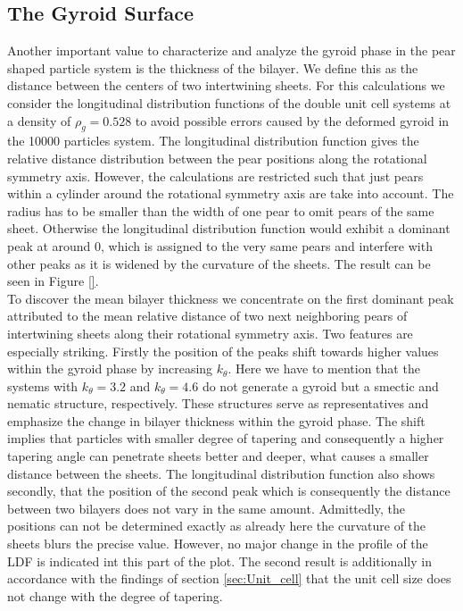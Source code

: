 \documentclass[epj,onecolumn]{webofc}
\begin{document}
\subsection{The Gyroid Surface}
\label{sec:Distance}

Another important value to characterize and analyze the gyroid phase in the pear shaped particle system is the thickness of the bilayer. We define this as the distance between the centers of two intertwining sheets. For this 
calculations we consider the longitudinal distribution functions of the double unit cell systems at a density of $\rho_g=0.528$ to avoid possible errors caused by the deformed gyroid in the 10000 particles system. The longitudinal 
distribution function gives the relative distance distribution between the pear positions along the rotational symmetry axis. However, the calculations are restricted such that just pears within a cylinder around the rotational 
symmetry axis are take into account. The radius has to be smaller than the width of one pear to omit pears of the same sheet. Otherwise the longitudinal distribution function would exhibit a dominant peak at around 0, which is 
assigned to the very same pears and interfere with other peaks as it is widened by the curvature of the sheets. The result can be seen in Figure \ref{}.\\

To discover the mean bilayer thickness we concentrate on the first dominant peak attributed to the mean relative distance of two next neighboring pears of intertwining sheets along their rotational symmetry axis. Two features 
are especially striking. Firstly the position of the peaks shift towards higher values within the gyroid phase by increasing $k_{\theta}$. Here we have to mention that the systems with $k_{\theta}=3.2$ and $k_{\theta}=4.6$ do not 
generate a gyroid but a smectic and nematic structure, respectively. These structures serve as representatives and emphasize the change in bilayer thickness within the gyroid phase. The shift implies that particles with smaller 
degree of tapering and consequently a higher tapering angle can penetrate sheets better and deeper, what causes a smaller distance between the sheets. The longitudinal distribution function also shows secondly, that the 
position of the second peak which is consequently the distance between two bilayers does not vary in the same amount. Admittedly, the positions can not be determined exactly as already here the curvature of the sheets blurs 
the precise value. However, no major change in the profile of the LDF is indicated int this part of the plot. The second result is additionally in accordance with the findings of section \ref{sec:Unit_cell} that the unit cell size does 
not change with the degree of tapering.\\
\end{document}
